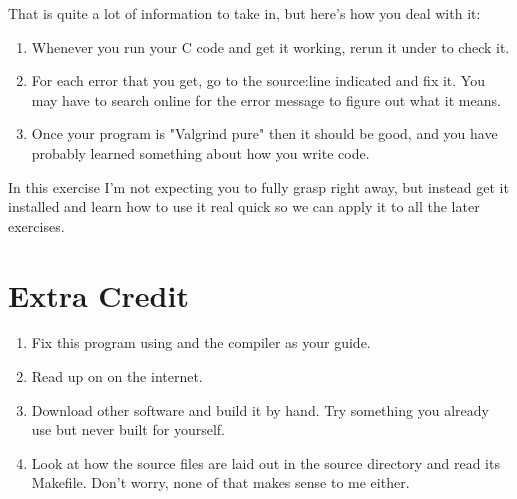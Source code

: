 That is quite a lot of information to take in, but here's how you deal with it:

\begin{enumerate}
\item Whenever you run your C code and get it working, rerun it under 
    to check it.
\item For each error that you get, go to the source:line indicated and
    fix it.  You may have to search online for the error message to figure out
    what it means.
\item Once your program is "Valgrind pure" then it should be good, and you
    have probably learned something about how you write code.
\end{enumerate}

In this exercise I'm not expecting you to fully grasp  right
away, but instead get it installed and learn how to use it real quick so we
can apply it to all the later exercises.

\section{Extra Credit}

\begin{enumerate}
\item Fix this program using  and the compiler as your guide.
\item Read up on  on the internet.
\item Download other software and build it by hand. Try something you already
    use but never built for yourself.
\item Look at how the  source files are laid out in the
    source directory and read its Makefile.  Don't worry, none of that
    makes sense to me either.
\end{enumerate}

